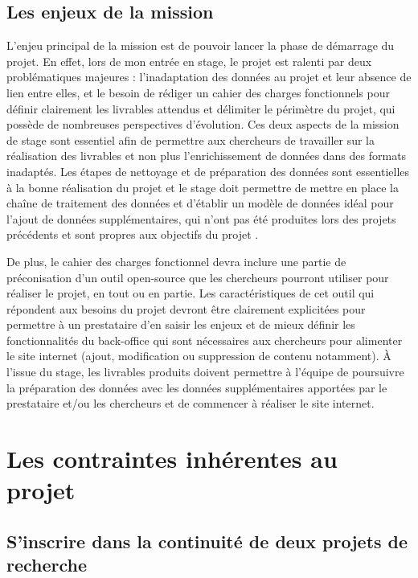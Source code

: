 \subsection{Les enjeux de la mission}
L'enjeu principal de la mission est de pouvoir lancer la phase de démarrage du projet. En effet, lors de mon entrée en stage, le projet est ralenti par deux problématiques majeures : l'inadaptation des données au projet et leur absence de lien entre elles, et le besoin de rédiger un cahier des charges fonctionnels pour définir clairement les livrables attendus et délimiter le périmètre du projet, qui possède de nombreuses perspectives d'évolution. Ces deux aspects de la mission de stage sont essentiel afin de permettre aux chercheurs de travailler sur la réalisation des livrables et non plus l'enrichissement de données dans des formats inadaptés. Les étapes de nettoyage et de préparation des données sont essentielles à la bonne réalisation du projet et le stage doit permettre de mettre en place la chaîne de traitement des données et d'établir un modèle de données idéal pour l'ajout de données supplémentaires, qui n'ont pas été produites lors des projets précédents et sont propres aux objectifs du projet \COREL.

De plus, le cahier des charges fonctionnel devra inclure une partie de préconisation d'un outil open-source que les chercheurs pourront utiliser pour réaliser le projet, en tout ou en partie. Les caractéristiques de cet outil qui répondent aux besoins du projet devront être clairement explicitées pour permettre à un prestataire d'en saisir les enjeux et de mieux définir les fonctionnalités du back-office qui sont nécessaires aux chercheurs pour alimenter le site internet (ajout, modification ou suppression de contenu notamment). À l'issue du stage, les livrables produits doivent permettre à l'équipe de poursuivre la préparation des données avec les données supplémentaires apportées par le prestataire et/ou les chercheurs et de commencer à réaliser le site internet. 

\section{Les contraintes inhérentes au projet}
    \subsection{S’inscrire dans la continuité de deux projets de recherche}


